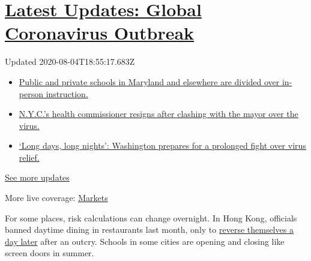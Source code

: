 \hypertarget{latest-updates-global-coronavirus-outbreak}{%
\section{\texorpdfstring{\href{https://www.nytimes3xbfgragh.onion/2020/08/04/world/coronavirus-cases.html?action=click\&pgtype=Article\&state=default\&region=MAIN_CONTENT_1\&context=storylines_live_updates}{Latest
Updates: Global Coronavirus
Outbreak}}{Latest Updates: Global Coronavirus Outbreak}}\label{latest-updates-global-coronavirus-outbreak}}

Updated 2020-08-04T18:55:17.683Z

\begin{itemize}
\tightlist
\item
  \href{https://www.nytimes3xbfgragh.onion/2020/08/04/world/coronavirus-cases.html?action=click\&pgtype=Article\&state=default\&region=MAIN_CONTENT_1\&context=storylines_live_updates\#link-4825b93}{Public
  and private schools in Maryland and elsewhere are divided over
  in-person instruction.}
\item
  \href{https://www.nytimes3xbfgragh.onion/2020/08/04/world/coronavirus-cases.html?action=click\&pgtype=Article\&state=default\&region=MAIN_CONTENT_1\&context=storylines_live_updates\#link-4d1eafa8}{N.Y.C.'s
  health commissioner resigns after clashing with the mayor over the
  virus.}
\item
  \href{https://www.nytimes3xbfgragh.onion/2020/08/04/world/coronavirus-cases.html?action=click\&pgtype=Article\&state=default\&region=MAIN_CONTENT_1\&context=storylines_live_updates\#link-6b644638}{`Long
  days, long nights': Washington prepares for a prolonged fight over
  virus relief.}
\end{itemize}

\href{https://www.nytimes3xbfgragh.onion/2020/08/04/world/coronavirus-cases.html?action=click\&pgtype=Article\&state=default\&region=MAIN_CONTENT_1\&context=storylines_live_updates}{See
more updates}

More live coverage:
\href{https://www.nytimes3xbfgragh.onion/live/2020/08/04/business/stock-market-today-coronavirus?action=click\&pgtype=Article\&state=default\&region=MAIN_CONTENT_1\&context=storylines_live_updates}{Markets}

For some places, risk calculations can change overnight. In Hong Kong,
officials banned daytime dining in restaurants last month, only to
\href{https://www.nytimes3xbfgragh.onion/2020/07/31/world/asia/hongkong-dining-lunch-coronavirus.html}{reverse
themselves a day later} after an outcry. Schools in some cities are
opening and closing like screen doors in summer.


